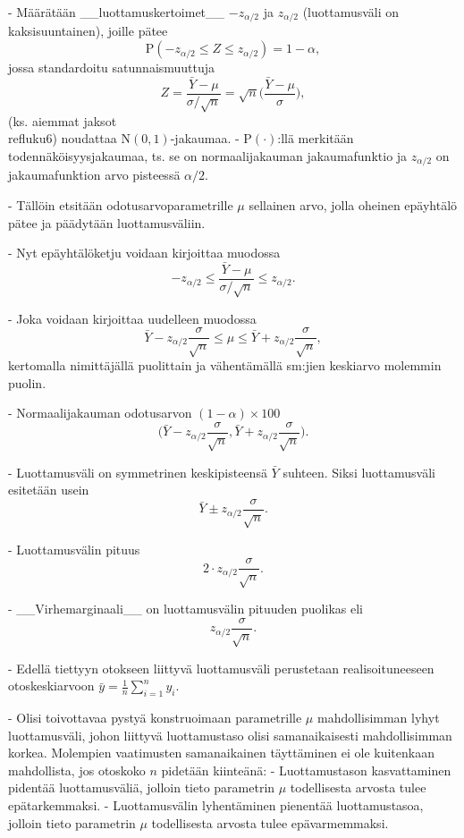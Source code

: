 \documentclass[
]{book}
\begin{document}
\begin{itemize}
- Määrätään __luottamuskertoimet__ $-z_{\alpha/2}$ ja $z_{\alpha/2}$ (luottamusväli on kaksisuuntainen), joille pätee
$$
\text{P}(-z_{\alpha/2} \le Z \le z_{\alpha/2}) = 1-\alpha,
$$
jossa standardoitu satunnaismuuttuja
$$
Z = \frac{\bar{Y} - \mu}{\sigma / \sqrt{n}} = \sqrt{n} \Big( \frac{\bar{Y} - \mu}{\sigma} \Big),  
$$
(ks. aiemmat jaksot \\ref{luku6}) noudattaa $\text{N}(0,1)$-jakaumaa. 
  - $\text{P}(\cdot)$:llä merkitään todennäköisyysjakaumaa, ts. se on normaalijakauman jakaumafunktio ja $z_{\alpha/2}$ on jakaumafunktion arvo pisteessä $\alpha/2$.

- Tällöin etsitään odotusarvoparametrille $\mu$ sellainen arvo, jolla oheinen epäyhtälö pätee ja päädytään luottamusväliin.

- Nyt epäyhtälöketju voidaan kirjoittaa muodossa
$$
-z_{\alpha/2} \le  \frac{\bar{Y} - \mu}{\sigma / \sqrt{n}}  \le z_{\alpha/2}.
$$

- Joka voidaan kirjoittaa uudelleen muodossa
$$
\bar{Y} - z_{\alpha/2} \frac{\sigma}{\sqrt{n}} \le   \mu  \le 
\bar{Y} + z_{\alpha/2} \frac{\sigma}{\sqrt{n}},
$$
kertomalla nimittäjällä puolittain ja vähentämällä sm:jien keskiarvo molemmin puolin. 

- Normaalijakauman odotusarvon $(1-\alpha) \times 100$%
$$
\Big(\bar{Y} - z_{\alpha/2} \frac{\sigma}{\sqrt{n}}, 
\bar{Y} + z_{\alpha/2} \frac{\sigma}{\sqrt{n}} \Big).
$$

- Luottamusväli on symmetrinen keskipisteensä $\bar{Y}$ suhteen. Siksi luottamusväli esitetään usein
$$
\bar{Y} \pm z_{\alpha/2} \frac{\sigma}{\sqrt{n}}.
$$

- Luottamusvälin pituus
$$
2 \cdot z_{\alpha/2} \frac{\sigma}{\sqrt{n}}.
$$

- __Virhemarginaali__ on luottamusvälin pituuden puolikas eli 
$$
z_{\alpha/2} \frac{\sigma}{\sqrt{n}}.
$$

- Edellä tiettyyn otokseen liittyvä luottamusväli perustetaan realisoituneeseen otoskeskiarvoon $\bar{y}=\frac{1}{n} \sum_{i=1}^{n} y_i$.

- Olisi toivottavaa pystyä konstruoimaan parametrille $\mu$ mahdollisimman lyhyt luottamusväli, johon liittyvä luottamustaso olisi samanaikaisesti mahdollisimman korkea. Molempien vaatimusten samanaikainen täyttäminen ei ole kuitenkaan mahdollista, jos otoskoko $n$ pidetään kiinteänä:
  - Luottamustason kasvattaminen pidentää luottamusväliä, jolloin tieto parametrin $\mu$ todellisesta arvosta tulee epätarkemmaksi.
  - Luottamusvälin lyhentäminen pienentää luottamustasoa, jolloin tieto parametrin $\mu$ todellisesta arvosta tulee epävarmemmaksi.


\end{itemize}
\end{document}
